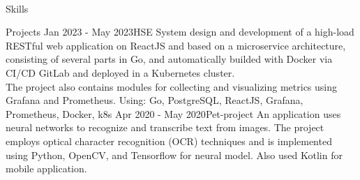 \documentclass[]{resume-knyte}
\begin{document}



\begin{subheader}{1}
    \\
\end{subheader}


\begin{topic}{Skills}
    \\
\end{topic}


\begin{topic}{Projects}
    {Jan 2023 - May 2023}{HSE}
    {System design and development of a high-load RESTful web application on ReactJS and based on a microservice architecture, consisting of several parts in Go, and automatically builded with Docker via CI/CD GitLab and deployed in a Kubernetes cluster. \\The project also contains modules for collecting and visualizing metrics using Grafana and Prometheus.
    \newline
    Using: Go, PostgreSQL, ReactJS, Grafana, Prometheus, Docker, k8s}
    {Apr 2020 - May 2020}{Pet-project}
    {An application uses neural networks to recognize and transcribe text from images. The project employs optical character recognition (OCR) techniques and is implemented using Python, OpenCV, and Tensorflow for neural model. Also used Kotlin for mobile application.}
\end{topic}
\end{document}
